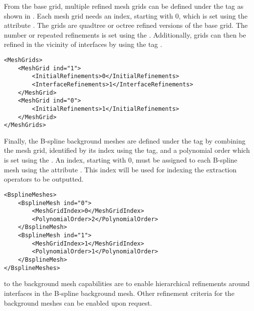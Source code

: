 From the base grid, multiple refined mesh grids can be defined under the tag  as shown in . Each mesh grid needs an index, starting with $0$, which is set using the attribute . The grids are quadtree or octree refined versions of the base grid. The number or repeated refinements is set using the . Additionally, grids can then be refined in the vicinity of interfaces by using the tag .

\begin{minipage}{\linewidth}
\vspace{0.5cm}
\begin{lstlisting}[caption={Definition of a multiple mesh grids},captionpos=b, label={lst:mesh_grids}]
<MeshGrids>
    <MeshGrid ind="1">
        <InitialRefinements>0</InitialRefinements>
        <InterfaceRefinements>1</InterfaceRefinements>
    </MeshGrid>
    <MeshGrid ind="0">
        <InitialRefinements>1</InitialRefinements>
    </MeshGrid>
</MeshGrids>
\end{lstlisting}
\end{minipage}

\hypertarget{bspline_mesh_definition}{}
Finally, the B-spline background meshes are defined under the tag  by combining the mesh grid, identified by its index using the  tag, and a polynomial order which is set using the . An index, starting with $0$, must be assigned to each B-spline mesh using the attribute . This index will be used for indexing the extraction operators to be outputted.

\begin{minipage}{\linewidth}
\vspace{0.5cm}
\begin{lstlisting}[caption={Definition of a multiple mesh grids},captionpos=b, label={lst:bsp_meshes}]
<BsplineMeshes>
    <BsplineMesh ind="0">
        <MeshGridIndex>0</MeshGridIndex>
        <PolynomialOrder>2</PolynomialOrder>
    </BsplineMesh>
    <BsplineMesh ind="1">
        <MeshGridIndex>1</MeshGridIndex>
        <PolynomialOrder>1</PolynomialOrder>
    </BsplineMesh>
</BsplineMeshes>
\end{lstlisting}
\end{minipage}

 to the background mesh capabilities are to enable hierarchical refinements around interfaces in the B-spline background mesh. Other refinement criteria for the background meshes can be enabled upon request.

